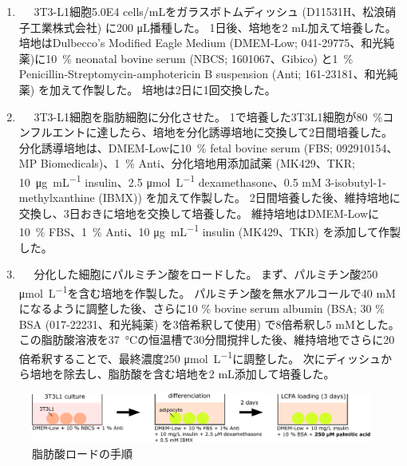 \documentclass[uplatex,a4paper]{jsarticle}
\begin{document}
\begin{enumerate}
	\item 　
	3T3-L1細胞\num{5.0E4} cells/mLをガラスボトムディッシュ (D11531H、松浪硝子工業株式会社) に200 \si{\uL}播種した。
	1日後、培地を2 mL加えて培養した。
	培地はDulbecco's Modified Eagle Medium (DMEM-Low; 041-29775、和光純薬)に\SI{10}{\percent} neonatal bovine serum (NBCS; 1601067、Gibico) と\SI{1}{\percent} Penicillin-Streptomycin-amphotericin B suspension (Anti; 161-23181、和光純薬) を加えて作製した。
	培地は2日に1回交換した。\\

	\item 　
	3T3-L1細胞を脂肪細胞に分化させた。
	1で培養した3T3L1細胞が\SI{80}{\percent}コンフルエントに達したら、培地を分化誘導培地に交換して2日間培養した。
	分化誘導培地は、DMEM-Lowに\SI{10}{\percent} fetal bovine serum (FBS; 092910154、MP Biomedicals)、\SI{1}{\percent} Anti、分化培地用添加試薬 (MK429、TKR; \SI{10}{\ug\per\mL} insulin、2.5 \si{\micro\mol\per\L} dexamethasone、0.5 mM 3-isobutyl-1-methylxanthine (IBMX)) を加えて作製した。
	2日間培養した後、維持培地に交換し、3日おきに培地を交換して培養した。
	維持培地はDMEM-Lowに\SI{10}{\percent} FBS、\SI{1}{\percent} Anti、10 \si{\ug\per\mL} insulin (MK429、TKR) を添加して作製した。\\

	\item 　
	分化した細胞にパルミチン酸をロードした。
	まず、パルミチン酸250 \si{\micro\mol\per\L}を含む培地を作製した。
	パルミチン酸を無水アルコールで40 mMになるように調整した後、さらに10 \si{\percent} bovine serum albumin (BSA; 30 \si{\percent} BSA (017-22231、和光純薬) を3倍希釈して使用) で8倍希釈し5 mMとした。
	この脂肪酸溶液を\SI{37}{\degreeCelsius}の恒温槽で30分間撹拌した後、維持培地でさらに20倍希釈することで、最終濃度250 \si{\micro\mol\per\L}に調整した。
	次にディッシュから培地を除去し、脂肪酸を含む培地を2 mL添加して培養した。

\end{enumerate}

\begin{figure}[H]
	\centering
	\includegraphics[width=15cm,pagebox=cropbox,clip]{figure/2_1_FAload.pdf}
	\caption{脂肪酸ロードの手順 \label{fig:FAload}}
\end{figure}
\end{document}
